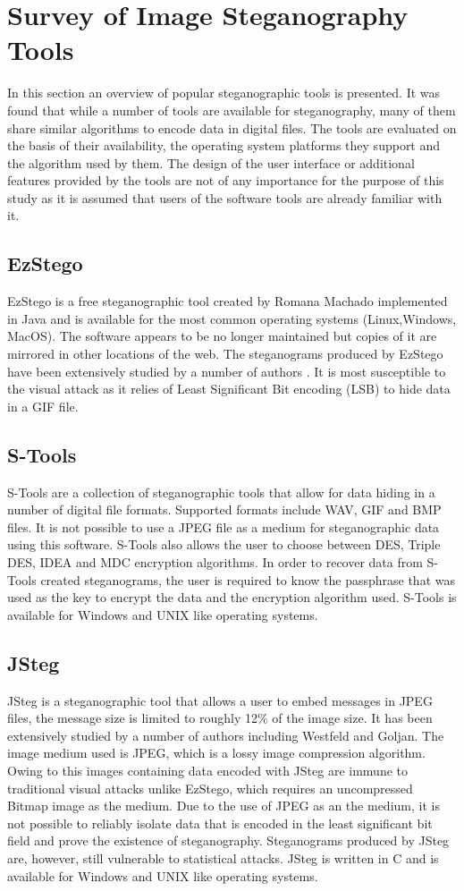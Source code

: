 \documentclass[12pt]{extreport}
\begin{document}
\section{Survey of Image Steganography Tools}
\label{sec:tools}
In this section an overview of popular steganographic tools is presented. It was found that while a number of tools are available for steganography, many of them share similar algorithms to encode data in digital files.  The tools are evaluated on the basis of their availability, the operating system platforms they support and the algorithm used by them. The design of the user interface or additional features provided by the tools are not of any importance for the purpose of this study as it is assumed that users of the software tools are already familiar with it.
\subsection{EzStego}
EzStego \cite{ezstego} is a free steganographic tool created by Romana Machado  implemented in Java and is available for the most common operating systems (Linux,Windows, MacOS). The software appears to be no longer maintained but copies of it are mirrored in other locations of the web. The steganograms produced by EzStego have been extensively studied by a number of authors  \cite{westfeld2000attacks, farid2002detecting}. It is most susceptible to the visual attack as it relies of Least Significant Bit encoding (LSB) to hide data in a GIF file. 
\subsection{S-Tools}
S-Tools \cite{stools} are a collection of steganographic tools that allow for data hiding in a number of digital file formats. Supported formats include WAV, GIF and BMP files. It is not possible to use a JPEG file as a medium for steganographic data using this software.  S-Tools also allows the user to choose between DES, Triple DES, IDEA and MDC encryption algorithms. In order to recover data from S-Tools created steganograms,  the user is required to know the passphrase that was used as the key to encrypt the data and the encryption algorithm used.  S-Tools is available for Windows and UNIX like operating systems.
\subsection{JSteg} 
JSteg \cite{jsteg} is a steganographic tool that allows a user to embed messages in JPEG files, the message size is limited to roughly 12\% of the image size. It has been extensively studied by a number of authors including Westfeld and Goljan. The image medium used is JPEG, which is a lossy image compression algorithm. Owing to this images containing data encoded with JSteg are immune to traditional visual attacks unlike EzStego, which requires an uncompressed Bitmap image as the medium. Due to the use of JPEG as an the medium, it is not possible to reliably isolate data that is encoded in the least significant bit field and prove the existence of steganography. Steganograms produced by JSteg are, however, still vulnerable to statistical attacks. JSteg is written in C and is available for Windows and UNIX like operating systems.
\end{document}
